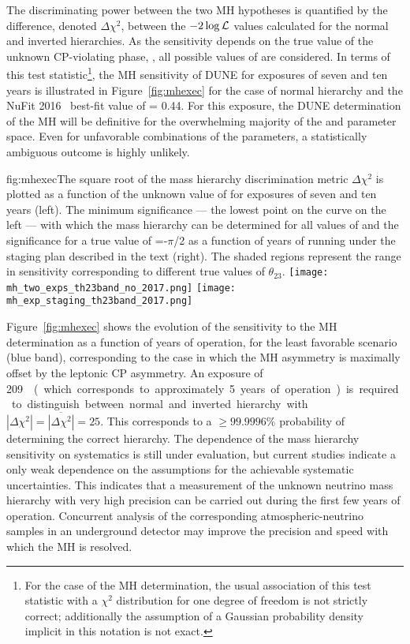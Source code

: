 The discriminating power between the two MH hypotheses is quantified
by the difference, denoted $\Delta \chi^2$, between the
$-2\log{\cal L}$ values calculated for the normal and inverted
hierarchies. As the sensitivity depends on the true value of the unknown
CP-violating phase, \deltacp, all possible values of \deltacp are
considered.  In terms of this test statistic\footnote{For the case of the MH determination, the usual
  association of this test statistic with a $\chi^2$ distribution for
  one degree of freedom is not strictly correct; additionally the assumption of a
  Gaussian probability density 
  implicit in this notation is not exact.}, the MH
sensitivity of DUNE for exposures of seven and ten years is
illustrated in Figure~\ref{fig:mhexec} for the case of normal
hierarchy and the NuFit 2016~\cite{nufit2016} best-fit value of  = 0.44. 
For this exposure, the DUNE determination of the MH will be definitive for
the overwhelming majority of the  \deltacp and  parameter space.
Even for unfavorable combinations of the parameters, a statistically
ambiguous outcome is highly unlikely.  
\begin{dunefigure}{fig:mhexec}{The
    square root of the mass hierarchy discrimination metric $\Delta
    \chi^2$ is plotted as a function of the unknown value of \deltacp
    for exposures of seven and ten years  
    (left).  The minimum significance
    --- the lowest point on the curve on the left --- with which the mass
    hierarchy can be determined for all values of \deltacp and the significance for a true value of \deltacp=-$\pi$/2 as a
    function of years of running under the staging plan described in the text (right).
    The shaded regions represent the range in sensitivity corresponding to
    different true values of $\theta_{23}$.}
\texttt{[image: mh\_two\_exps\_th23band\_no\_2017.png]}
\texttt{[image: mh\_exp\_staging\_th23band\_2017.png]}
\end{dunefigure}


Figure~\ref{fig:mhexec} shows the evolution of the sensitivity to the MH determination as a function
of years of operation, for the least favorable scenario (blue band), corresponding to the case in which the MH asymmetry is
maximally offset by the leptonic CP asymmetry. An exposure of \SI{209}~\ktMWyr{}  
(which corresponds to approximately \num{5} years of operation) is required to distinguish
between normal and inverted hierarchy with $|\Delta \chi^2| =
\overline{|\Delta \chi^2|} = 25$.  This corresponds to a $\geq
99.9996\%$ probability of determining the correct hierarchy. 
The dependence of the mass
hierarchy sensitivity on systematics is still under evaluation, but
current studies indicate a only weak dependence on the assumptions for 
the achievable systematic uncertainties. This indicates that a measurement of the unknown
neutrino mass hierarchy with very high precision can be carried out
during the first few years of operation.
Concurrent analysis of the corresponding atmospheric-neutrino
samples in an underground detector may improve the precision and
speed with which the MH is resolved.

